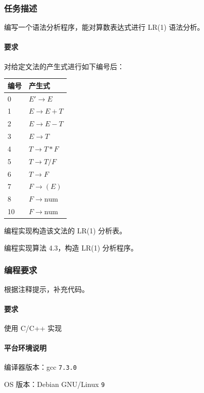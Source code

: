 \subsubsection{任务描述}

编写一个语法分析程序，能对算数表达式进行 LR(1) 语法分析。

\paragraph{要求}对给定文法的产生式进行如下编号后：
\begin{table}[htbp]
    \centering
    \begin{tabular}{ll}
        \hline
        编号 & 产生式                \\ \hline
        0  & $E'\to E  $        \\
        1  & $E \to E+T$        \\
        2  & $E \to E-T$        \\
        3  & $E \to T  $        \\
        4  & $T \to T*F$        \\
        5  & $T \to T/F$        \\
        6  & $T \to F  $        \\
        7  & $F \to (E)$        \\
        8  & $F \to \text{num}$ \\
        10 & $F \to \text{num}$ \\ \hline
    \end{tabular}
\end{table}
\begin{compactenum}
    \item 编程实现构造该文法的 LR(1) 分析表。
    \item 编程实现算法 4.3，构造 LR(1) 分析程序。
\end{compactenum}

\subsubsection{编程要求}

根据注释提示，补充代码。
\paragraph{要求} 使用 C/C++ 实现

\paragraph{平台环境说明}
\begin{compactitem}
    \item 编译器版本：gcc \texttt{7.3.0}
    \item OS 版本：Debian GNU/Linux \texttt{9}
\end{compactitem}

